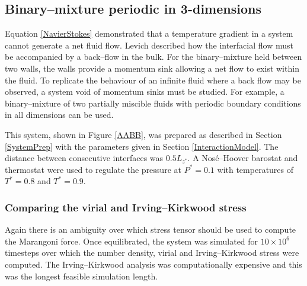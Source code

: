 \FloatBarrier
\subsection{Binary--mixture periodic in 3-dimensions}
Equation \ref{NavierStokes} demonstrated that a temperature gradient in a system cannot generate a net fluid flow.
Levich described how the interfacial flow must be accompanied by a back--flow in the bulk.\cite{Levich}
For the binary--mixture held between two walls, the walls provide a momentum sink allowing a net flow to exist within the fluid.
To replicate the behaviour of an infinite fluid where a back flow may be observed, a system void of momentum sinks must be studied.
For example, a binary--mixture of two partially miscible fluids with periodic boundary conditions in all dimensions can be used.

This system, shown in Figure \ref{AABB}, was prepared as described in Section \ref{SystemPrep} with the parameters given in Section \ref{InteractionModel}.
The distance between consecutive interfaces was $0.5 L_{z^{*}}$.
A Nos\'{e}--Hoover barostat and thermostat were used to regulate the pressure at $P^{*} = 0.1$ with temperatures of $T^{*}=0.8$ and $T^{*}=0.9$.

\subsubsection{Comparing the virial and Irving--Kirkwood stress}
Again there is an ambiguity over which stress tensor should be used to compute the Marangoni force.
Once equilibrated, the system was simulated for $10 \times 10^{6}$ timesteps over which the number density, virial and Irving--Kirkwood stress were computed.
The Irving--Kirkwood analysis was computationally expensive and this was the longest feasible simulation length.
\FloatBarrier

